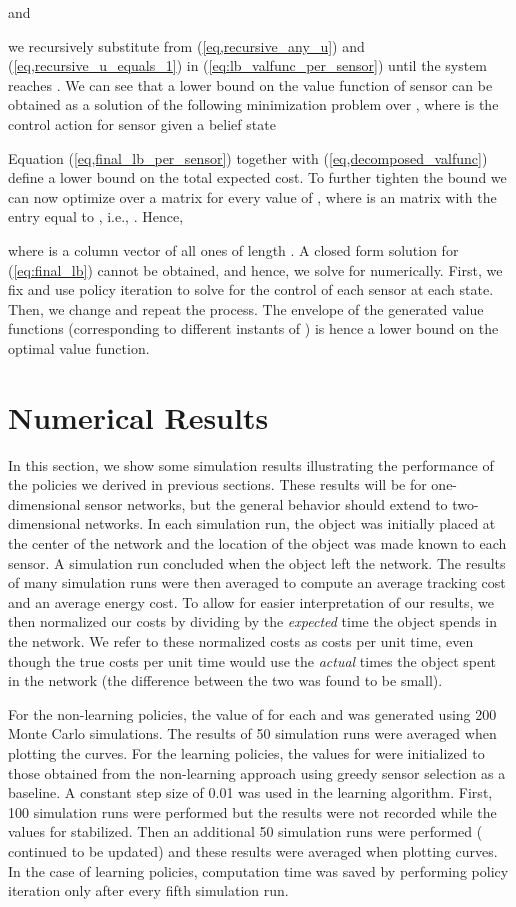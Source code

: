 \documentclass[journal,draftcls,onecolumn,11pt]{IEEEtran}
\newcommand{\QMDP}{}
\begin{document}
and

we recursively substitute from (\ref{eq,recursive_any_u}) and (\ref{eq,recursive_u_equals_1}) in (\ref{eq:lb_valfunc_per_sensor}) until the system reaches . We can see that a lower bound on the value function of sensor  can be obtained as a solution of the following minimization problem over , where  is the control action for sensor  given a belief state 


Equation (\ref{eq,final_lb_per_sensor}) together with (\ref{eq,decomposed_valfunc}) define a lower bound on the total expected cost. To further tighten the bound we can now optimize over a matrix  for every value of , where  is an  matrix with the  entry equal to , i.e., . Hence,


where  is a column vector of all ones of length . A closed form solution for (\ref{eq:final_lb}) cannot be obtained, and hence, we solve for  numerically. First, we fix  and use policy iteration \cite{bertsekas07} to solve for the control of each sensor at each state. Then, we change  and repeat the process. The envelope of the generated value functions (corresponding to different instants of ) is hence a lower bound on the optimal value function.

\section{Numerical Results} \label{sec:num_res}
In this section, we show some simulation results illustrating the performance of the policies we derived in previous sections.  These results will be for one-dimensional sensor networks, but the general behavior should extend to two-dimensional networks.  In each simulation run, the object was initially placed at the center of the network and the location of the object was made known to each sensor.  A simulation run concluded when the object left the network.  The results of many simulation runs were then averaged to compute an average tracking cost and an average energy cost.  To allow for easier interpretation of our results, we then normalized our costs by dividing by the {\em expected} time the object spends in the network.  We refer to these normalized costs as costs per unit time, even though the true costs per unit time would use the {\em actual} times the object spent in the network (the difference between the two was found to be small).

For the non-learning policies, the value of  for each  and  was generated using 200 Monte Carlo simulations.  The results of 50 simulation runs were averaged when plotting the curves.  For the learning policies, the values for  were initialized to those obtained from the non-learning approach using greedy sensor selection as a baseline.  A constant step size of 0.01 was used in the learning algorithm.  First, 100 simulation runs were performed but the results were not recorded while the values for   stabilized.  Then an additional 50 simulation runs were performed ( continued to be updated) and these results were averaged when plotting curves.  In the case of \QMDP{} learning policies, computation time was saved by performing policy iteration only after every fifth simulation run.
\end{document}
